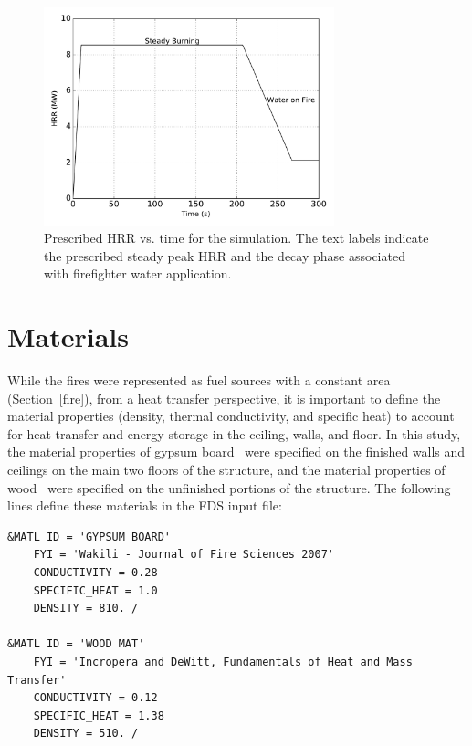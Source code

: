 \documentclass[12pt,oneside]{book}
\begin{document}
\begin{figure}[!ht]
\includegraphics[width=0.75\textwidth]{../Figures/Fire_HRR}
\caption[Prescribed HRR vs. time for the simulation.]
{Prescribed HRR vs. time for the simulation. The text labels indicate the prescribed steady peak HRR and the decay phase associated with firefighter water application.}
\label{fig:hrr}
\end{figure}

\clearpage

\section{Materials}
\label{matl}
While the fires were represented as fuel sources with a constant area (Section~\ref{fire}), from a heat transfer perspective, it is important to define the material properties (density, thermal conductivity, and specific heat) to account for heat transfer and energy storage in the ceiling, walls, and floor. In this study, the material properties of gypsum board~\cite{WAKILI2007} were specified on the finished walls and ceilings on the main two floors of the structure, and the material properties of wood~\cite{Incropera:1} were specified on the unfinished portions of the structure. The following lines define these materials in the FDS input file:

\begin{lstlisting}
&MATL ID = 'GYPSUM BOARD'
    FYI = 'Wakili - Journal of Fire Sciences 2007' 
    CONDUCTIVITY = 0.28
    SPECIFIC_HEAT = 1.0
    DENSITY = 810. /

&MATL ID = 'WOOD MAT'
    FYI = 'Incropera and DeWitt, Fundamentals of Heat and Mass Transfer'
    CONDUCTIVITY = 0.12
    SPECIFIC_HEAT = 1.38
    DENSITY = 510. / 
\end{lstlisting}
\end{document}
